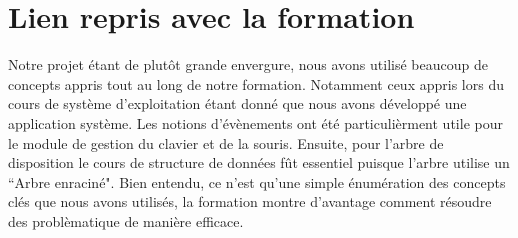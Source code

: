 \documentclass[titlepage]{article}
\begin{document}
\section{Lien repris avec la formation}
Notre projet étant de plutôt grande envergure, nous avons utilisé beaucoup de concepts appris tout au long de notre formation. Notamment ceux appris lors du cours de système d'exploitation étant donné que nous avons développé une application système. Les notions d'évènements ont été particulièrment utile pour le module de gestion du clavier et de la souris. Ensuite, pour l'arbre de disposition le cours de structure de données fût essentiel puisque l'arbre utilise un ``Arbre enraciné". Bien entendu, ce n'est qu'une simple énumération des concepts clés que nous avons utilisés, la formation montre d'avantage comment résoudre des problèmatique de manière efficace.
\end{document}
